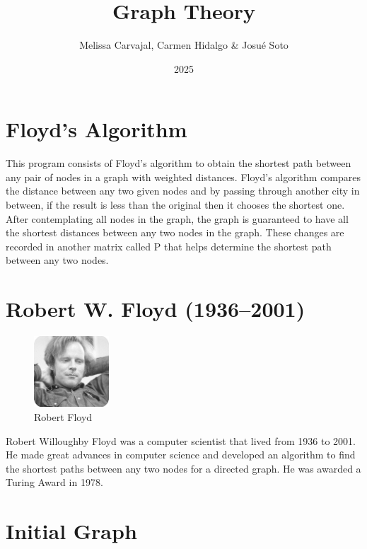 \documentclass{article}
\begin{document}
\title{Graph Theory}
\author{Melissa Carvajal, Carmen Hidalgo \& Josu\'e Soto}
\date{2025}


\maketitle

\newpage


\section{Floyd's Algorithm}
This program consists of Floyd's algorithm to obtain the shortest path between any pair of nodes in a graph with weighted distances.
Floyd's algorithm compares the distance between any two given nodes and by passing through another city in between, if the result is less than the original then it chooses the shortest one. After contemplating all nodes in the graph, the graph is guaranteed to have all the shortest distances between any two nodes in the graph. These changes are recorded in another matrix called P that helps determine the shortest path between any two nodes.
\section{Robert W. Floyd (1936–2001)}
\begin{figure}
\begin{center}
\includegraphics[width=0.25\textwidth]{floyd.jpg}
\caption{\label{fig:floyd}Robert Floyd}
\end{center}
\end{figure}

Robert Willoughby Floyd was a computer scientist that lived from 1936 to 2001. He made great advances in computer science and developed an algorithm to find the shortest paths between any two nodes for a directed graph. He was awarded a Turing Award in 1978.


\section{Initial Graph}
\begin{center}
\end{center}
\end{document}
